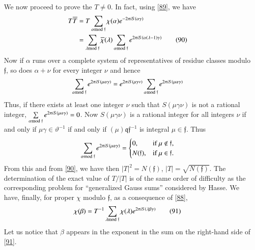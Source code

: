 We now proceed to prove the $T\neq 0$. In fact, using \eqref{89}, we
have
\begin{align*}
T\overline{T} & =T\sum_{\alpha\rm{mod} \;\mathfrak{f}}\chi(\alpha)e^{-2\pi
  iS(\alpha\gamma)}\\
&=
\sum_{\lambda\rm{mod} \;\mathfrak{f}}\overline{\chi}(\lambda)\sum_{\alpha\rm{mod} \;\mathfrak{f}}e^{2\pi
  iS(\alpha(\lambda-1)\gamma)}\tag{90}\label{90} 
\end{align*}\pageoriginale
Now if $\alpha$ runs over a complete system of representatives of
residue classes modulo $\mathfrak{f}$, so does $\alpha+\nu$ for every
integer $\nu$ and hence
$$
\sum_{\alpha\rm{mod} \;\mathfrak{f}}e^{2\pi iS(\mu\alpha\gamma)}=e^{2\pi
  iS(\mu\gamma\nu)}\sum_{\alpha\rm{mod} \;\mathfrak{f}}e^{2\pi
  iS(\mu\alpha\gamma)} 
$$
Thus, if there exists at least one integer $\nu$ such that
$S(\mu\gamma\nu)$ is not a rational integer,
$\sum\limits_{\alpha\rm{mod} \;\mathfrak{f}}e^{2\pi
  iS(\mu\alpha\gamma)}=0$. Now $S(\mu\gamma\nu)$ is a rational integer
for all integers $\nu$ if and only if $\mu\gamma\in\vartheta^{-1}$ \ie
if and only if $(\mu)\mathfrak{qf}^{-1}$ is integral \ie
$\mu\in\mathfrak{f}$. Thus
$$
\sum_{\alpha\rm{mod} \;\mathfrak{f}}e^{2\pi iS(\mu\alpha\gamma)}=
\begin{cases}
0, & \text{if } \mu\not\in \mathfrak{f},\\
N(\mathfrak{f}), & \text{if } \mu\in \mathfrak{f}. 
\end{cases}
$$
From this and from \eqref{90}, we have then $|T|^{2}=N(\mathfrak{f})$,
\ie $|T|=\sqrt{N(\mathfrak{f})}$. The determination of the exact value
of $T/|T|$ is of the same order of difficulty as the corresponding
problem for ``generalized Gauss sums'' considered by Hasse. We have,
finally, for proper $\chi$ modulo $\mathfrak{f}$, as a consequence of
\eqref{88}, 
\begin{equation*}
\chi(\beta)=T^{-1}\sum_{\lambda\rm{mod} \; \mathfrak{f}}\chi(\lambda)e^{2\pi
  iS(\lambda\beta\gamma)}\tag{91}\label{91} 
\end{equation*}
Let us notice that $\beta$ appears in the exponent in the sum on the
right-hand side of \eqref{91}.

